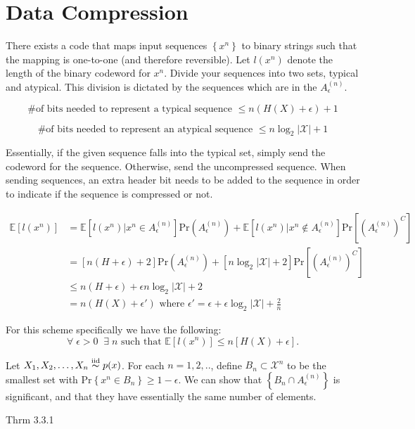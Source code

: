 \section{Data Compression}

There exists a code that maps input sequences \(\left\{ x^n \right\} \) to binary strings such that the mapping is one-to-one (and therefore reversible). Let \(l(x^n)\) denote the length of the binary codeword for \(x^n\). Divide your sequences into two sets, typical and atypical. This division is dictated by the sequences which are in the \(A_{\epsilon }^{(n)} \). 

\[
\text{\# of bits needed to represent a typical sequence  }  \leq n(H(X) + \epsilon ) + 1
\]

\[
\text{\# of bits needed to represent an atypical sequence  }  \leq n\log _2 |\mathcal{X} | + 1
\]

Essentially, if the given sequence falls into the typical set, simply send the codeword for the sequence. Otherwise, send the uncompressed sequence. When sending sequences, an extra header bit needs to be added to the sequence in order to indicate if the sequence is compressed or not.

\begin{align*}
    \mathbb{E} [l(x^n)] &= \mathbb{E} [l(x^n)|x^n \in A_{\epsilon }^{(n)} ] \mathrm{Pr}(A_{\epsilon }^{(n)} ) + \mathbb{E} [l(x^n)| x^n \notin A_{\epsilon }^{(n)} ]\mathrm{Pr} \left[ (A_{\epsilon }^{(n)} ) ^{C} \right] \\
    &= [n(H + \epsilon )+ 2]\mathrm{Pr}(A_{\epsilon }^{(n)} ) + \left[ n\log _2 \left\lvert \mathcal{X}  \right\rvert + 2  \right] \mathrm{Pr} \left[ (A_{\epsilon }^{(n)} ) ^{C} \right] \\
    &\leq n(H + \epsilon )+ \epsilon n \log _2|\mathcal{X} | + 2\\
    &= n(H(X) + \epsilon ')  \text{ where } \epsilon ' = \epsilon + \epsilon \log _2 \left\lvert \mathcal{X}     \right\rvert + \frac{2}{n}
\end{align*}

\begin{thrm}{}{}

    For this scheme specifically we have the following: 
\[
    \forall \; \epsilon >0 \;\;\exists \; n \text{ such that } \mathbb{E} [l(x^n)] \leq n \left[ H(X) + \epsilon  \right]. 
\]
\end{thrm}

\begin{defn}{}{}
Let \(X_1,X_2, \dots , X_{n} \overset{\text{iid} }{\thicksim} p(x)\). For each \(n = 1, 2, ..\), define \(B_{n} \subset \mathcal{X}^n \) to be the smallest set with \( \mathrm{Pr} \left\{ x^n \in B_{n}  \right\} \geq 1 - \epsilon   \). We can show that \(\left\{ B_{n} \cap A_{\epsilon }^{(n)}  \right\} \) is significant, and that they have essentially the same number of elements. 

Thrm 3.3.1 
\end{defn}


